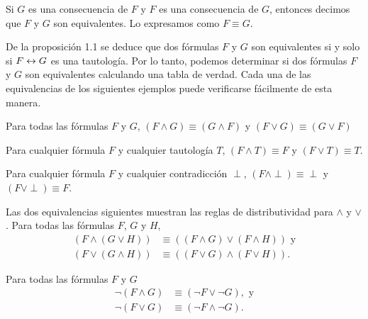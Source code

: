 \documentclass[12pt,a4paper]{book}
\begin{document}
    \begin{definicion}[Equivalencia]
        Si $G$ es una consecuencia de $F$ y $F$ es una consecuencia de $G$, entonces decimos que $F$ y $G$ son equivalentes. Lo expresamos
        como $F\equiv G$.
    \end{definicion}

    De la proposición 1.1 se deduce que dos fórmulas $F$ y $G$ son equivalentes si y solo si $F\leftrightarrow G$ es una tautología. Por lo tanto, podemos determinar si dos fórmulas
    $F$ y $G$ son equivalentes calculando una tabla de verdad. Cada una de las equivalencias de los siguientes ejemplos puede verificarse fácilmente de esta manera.

    \begin{ejemplo}
        Para todas las fórmulas $F$ y $G$, $(F\wedge G)\equiv(G\wedge F)$ y $(F\vee G)\equiv(G\vee F)$
    \end{ejemplo}

    \vspace{1.5cm}

    \begin{ejemplo}
        Para cualquier fórmula $F$ y cualquier tautología $T$, $(F\wedge T)\equiv F$ y $(F\vee T)\equiv T$.
    \end{ejemplo}

    \begin{ejemplo}
        Para cualquier fórmula $F$ y cualquier contradicción $\perp$, $(F\wedge\perp)\equiv\perp$ y $(F\vee\perp)\equiv F$.
    \end{ejemplo}

    \begin{ejemplo}\label{ej:distributividad}
        Las dos equivalencias siguientes muestran las reglas de distributividad para $\wedge$ y $\vee$. Para todas las fórmulas $F$, $G$ y $H$,
        \begin{align*}
            (F\wedge(G\vee H))&\equiv((F\wedge G)\vee(F\wedge H))\text{ y}\\
            (F\vee(G\wedge H))&\equiv((F\vee G)\wedge(F\vee H)).
        \end{align*}
    \end{ejemplo}

    \begin{ejemplo}\label{ej:demorgan}
        Para todas las fórmulas $F$ y $G$
        \begin{align*}
            \neg(F\wedge G)&\equiv(\neg F\vee\neg G),\text{ y}\\
            \neg(F\vee G)&\equiv(\neg F\wedge\neg G).
        \end{align*}
    \end{ejemplo}
\end{document}
